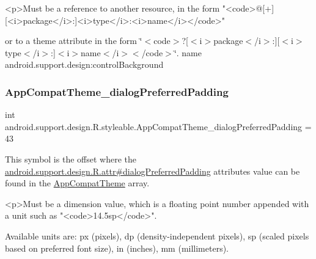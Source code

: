 \begin{DoxyVerb}      <p>Must be a reference to another resource, in the form "<code>@[+][<i>package</i>:]<i>type</i>:<i>name</i></code>"
\end{DoxyVerb}
 or to a theme attribute in the form \char`\"{}$<$code$>$?\mbox{[}$<$i$>$package$<$/i$>$\+:\mbox{]}\mbox{[}$<$i$>$type$<$/i$>$\+:\mbox{]}$<$i$>$name$<$/i$>$$<$/code$>$\char`\"{}.  name android.\+support.\+design\+:control\+Background \mbox{\label{classandroid_1_1support_1_1design_1_1R_1_1styleable_a404189687f7f202b9ed1a661ce3ac355}} 
\subsubsection{\texorpdfstring{App\+Compat\+Theme\+\_\+dialog\+Preferred\+Padding}{AppCompatTheme\_dialogPreferredPadding}}
{\footnotesize\ttfamily int android.\+support.\+design.\+R.\+styleable.\+App\+Compat\+Theme\+\_\+dialog\+Preferred\+Padding = 43\hspace{0.3cm}{\ttfamily [static]}}

This symbol is the offset where the \hyperlink{classandroid_1_1support_1_1design_1_1R_1_1attr_ae34cbd26b621f4e2f674c575d7722640}{android.\+support.\+design.\+R.\+attr\#dialog\+Preferred\+Padding} attribute\textquotesingle{}s value can be found in the \hyperlink{classandroid_1_1support_1_1design_1_1R_1_1styleable_afb351dc8de20cbd4c89abe360373010c}{App\+Compat\+Theme} array.

\begin{DoxyVerb}      <p>Must be a dimension value, which is a floating point number appended with a unit such as "<code>14.5sp</code>".
\end{DoxyVerb}
 Available units are\+: px (pixels), dp (density-\/independent pixels), sp (scaled pixels based on preferred font size), in (inches), mm (millimeters). 


